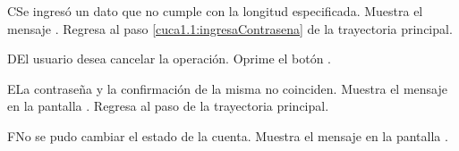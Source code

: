 \begin{UCtrayectoriaA}{C}{Se ingresó un dato que no cumple con la longitud especificada.}
	\UCpaso[\UCsist] Muestra el mensaje .
	\UCpaso[] Regresa al paso \ref{cuca1.1:ingresaContrasena} de la trayectoria principal.
\end{UCtrayectoriaA}

\begin{UCtrayectoriaA}{D}{El usuario desea cancelar la operación.}
	\UCpaso[\UCactor] Oprime el botón .
\end{UCtrayectoriaA}

\begin{UCtrayectoriaA}{E}{La contraseña y la confirmación de la misma no coinciden.}
	\UCpaso[\UCsist] Muestra el mensaje  en la pantalla .
	\UCpaso Regresa al paso \label{cuca1.1:ingresarContrasena} de la trayectoria principal.
\end{UCtrayectoriaA}

\begin{UCtrayectoriaA}{F}{No se pudo cambiar el estado de la cuenta.}
	\UCpaso[\UCsist] Muestra el mensaje  en la pantalla .
\end{UCtrayectoriaA}
